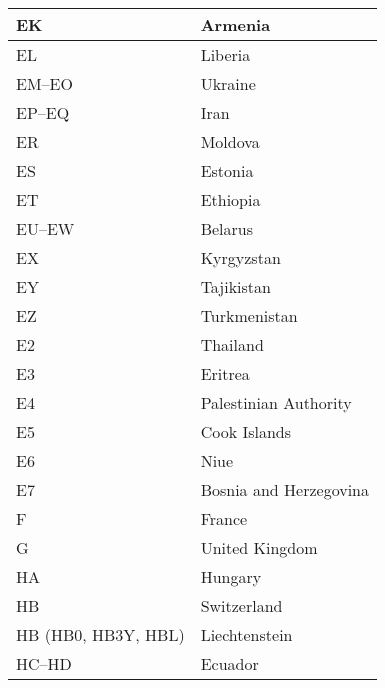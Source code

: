 \begin{longtable}{|l|l|}
  EK                  & Armenia                                   \\
  \hline
  EL                  & Liberia                                   \\
  \hline
  EM--EO              & Ukraine                                   \\
  \hline
  EP--EQ              & Iran                                      \\
  \hline
  ER                  & Moldova                                   \\
  \hline
  ES                  & Estonia                                   \\
  \hline
  ET                  & Ethiopia                                  \\
  \hline
  EU--EW              & Belarus                                   \\
  \hline
  EX                  & Kyrgyzstan                                \\
  \hline
  EY                  & Tajikistan                                \\
  \hline
  EZ                  & Turkmenistan                              \\
  \hline
  E2                  & Thailand                                  \\
  \hline
  E3                  & Eritrea                                   \\
  \hline
  E4                  & Palestinian Authority                     \\
  \hline
  E5                  & Cook Islands                              \\
  \hline
  E6                  & Niue                                      \\
  \hline
  E7                  & Bosnia and Herzegovina                    \\
  \hline
  F                   & France                                    \\
  \hline
  G                   & United Kingdom                            \\
  \hline
  HA                  & Hungary                                   \\
  \hline
  HB                  & Switzerland                               \\
  \hline
  HB (HB0, HB3Y, HBL) & Liechtenstein                             \\
  \hline
  HC--HD              & Ecuador                                   \\

\end{longtable}
